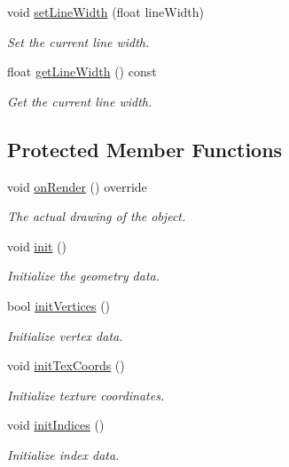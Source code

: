 \begin{DoxyCompactItemize}
void \mbox{\hyperlink{classec_1_1_dynamic_line_geometry_ad2a5b06e7ea10c771ed17ff0ffce4b3a}{set\+Line\+Width}} (float line\+Width)
\begin{DoxyCompactList}\small\item\em Set the current line width. \end{DoxyCompactList}\item 
float \mbox{\hyperlink{classec_1_1_dynamic_line_geometry_a0b32e465ad6a232b96dc3a0cd404ae62}{get\+Line\+Width}} () const
\begin{DoxyCompactList}\small\item\em Get the current line width. \end{DoxyCompactList}\end{DoxyCompactItemize}
\subsection*{Protected Member Functions}
\begin{DoxyCompactItemize}
\item 
void \mbox{\hyperlink{classec_1_1_dynamic_line_geometry_ab56984cee973ef2a73ff67339014f0cf}{on\+Render}} () override
\begin{DoxyCompactList}\small\item\em The actual drawing of the object. \end{DoxyCompactList}\item 
void \mbox{\hyperlink{classec_1_1_dynamic_line_geometry_a015c2ecc62d63de4ddce1f1a23897bc1}{init}} ()
\begin{DoxyCompactList}\small\item\em Initialize the geometry data. \end{DoxyCompactList}\item 
bool \mbox{\hyperlink{classec_1_1_dynamic_line_geometry_a4dced137976fc7b936bc80a8cb350b38}{init\+Vertices}} ()
\begin{DoxyCompactList}\small\item\em Initialize vertex data. \end{DoxyCompactList}\item 
void \mbox{\hyperlink{classec_1_1_dynamic_line_geometry_af556bfe516c6c93bc515f607bd3840b6}{init\+Tex\+Coords}} ()
\begin{DoxyCompactList}\small\item\em Initialize texture coordinates. \end{DoxyCompactList}\item 
void \mbox{\hyperlink{classec_1_1_dynamic_line_geometry_af622418944568bc0698d888024d4c2b0}{init\+Indices}} ()
\begin{DoxyCompactList}\small\item\em Initialize index data. \end{DoxyCompactList}\end{DoxyCompactItemize}

